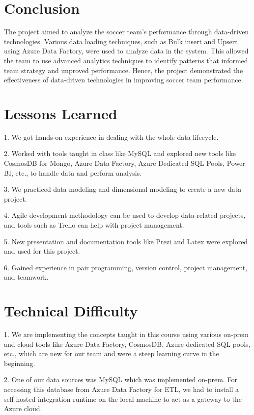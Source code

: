 \documentclass[lettersize]{IEEEtran}
\begin{document}
\section{\textbf{Conclusion}}
The project aimed to analyze the soccer team’s performance through data-driven technologies. Various data loading techniques, such as Bulk insert and Upsert using Azure Data Factory, were used to analyze data in the system. This allowed the team to use advanced analytics techniques to identify patterns that informed team strategy and improved performance. Hence, the project demonstrated the effectiveness of data-driven technologies in improving soccer team performance.

\section{\textbf{Lessons Learned}}
1. We got hands-on experience in dealing with the whole data lifecycle.

2. Worked with tools taught in class like MySQL and explored new tools like CosmosDB for Mongo, Azure Data Factory, Azure Dedicated SQL Pools, Power BI, etc., to handle data and perform analysis.

3. We practiced data modeling and dimensional modeling to create a new data project.

4. Agile development methodology can be used to develop data-related projects, and tools such as Trello can help with project management.

5. New presentation and documentation tools like Prezi and Latex were explored and used for this project.

6. Gained experience in pair programming, version control, project management, and teamwork.

\section{\textbf{Technical Difficulty}}
\vspace{-0.2\baselineskip}
1. We are implementing the concepts taught in this course using various on-prem and cloud tools like Azure Data Factory, CosmosDB, Azure dedicated SQL pools, etc., which are new for our team and were a steep learning curve in the beginning.

2. One of our data sources was MySQL which was implemented on-prem. For accessing this database from Azure Data Factory for ETL, we had to install a self-hosted integration runtime on the local machine to act as a gateway to the Azure cloud.
\end{document}
